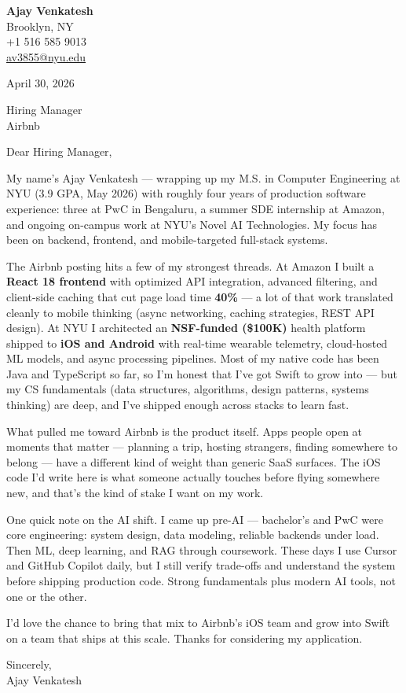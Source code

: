 \documentclass[letterpaper,11pt]{article}
\begin{document}
\begin{flushleft}
\textbf{\large Ajay Venkatesh} \\
Brooklyn, NY \\
+1 516 585 9013 \\
\href{mailto:av3855@nyu.edu}{av3855@nyu.edu}
\end{flushleft}

\vspace{10pt}

April 30, 2026

\vspace{6pt}

Hiring Manager \\
Airbnb

\vspace{10pt}

Dear Hiring Manager,

My name's Ajay Venkatesh --- wrapping up my M.S. in Computer Engineering at NYU (3.9 GPA, May 2026) with roughly four years of production software experience: three at PwC in Bengaluru, a summer SDE internship at Amazon, and ongoing on-campus work at NYU's Novel AI Technologies. My focus has been on backend, frontend, and mobile-targeted full-stack systems.

The Airbnb posting hits a few of my strongest threads. At Amazon I built a \textbf{React 18 frontend} with optimized API integration, advanced filtering, and client-side caching that cut page load time \textbf{40\%} --- a lot of that work translated cleanly to mobile thinking (async networking, caching strategies, REST API design). At NYU I architected an \textbf{NSF-funded (\$100K)} health platform shipped to \textbf{iOS and Android} with real-time wearable telemetry, cloud-hosted ML models, and async processing pipelines. Most of my native code has been Java and TypeScript so far, so I'm honest that I've got Swift to grow into --- but my CS fundamentals (data structures, algorithms, design patterns, systems thinking) are deep, and I've shipped enough across stacks to learn fast.

What pulled me toward Airbnb is the product itself. Apps people open at moments that matter --- planning a trip, hosting strangers, finding somewhere to belong --- have a different kind of weight than generic SaaS surfaces. The iOS code I'd write here is what someone actually touches before flying somewhere new, and that's the kind of stake I want on my work.

One quick note on the AI shift. I came up pre-AI --- bachelor's and PwC were core engineering: system design, data modeling, reliable backends under load. Then ML, deep learning, and RAG through coursework. These days I use Cursor and GitHub Copilot daily, but I still verify trade-offs and understand the system before shipping production code. Strong fundamentals plus modern AI tools, not one or the other.

I'd love the chance to bring that mix to Airbnb's iOS team and grow into Swift on a team that ships at this scale. Thanks for considering my application.

\vspace{12pt}

Sincerely, \\
Ajay Venkatesh
\end{document}
